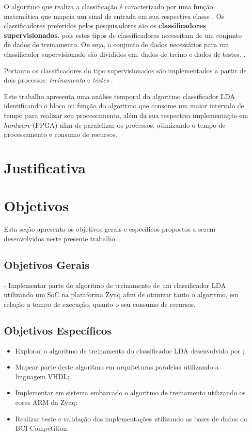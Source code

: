 O algoritmo que realiza a classificação é caracterizado por uma função matemática que mapeia um sinal de entrada em sua respectiva classe \cite{lottephd}. Os classificadores preferidos pelos pesquisadores são os \textbf{classificadores supervisionados}, pois estes tipos de classificadores necessitam de um conjunto de dados de treinamento. Ou seja, o conjunto de dados necessários para um classificador supervisionado são divididos em: dados de treino e dados de testes. \cite{Siulybook}.

Portanto os classificadores do tipo supervisionados são implementados a partir de dois processos: \textit{treinamento} e \textit{testes} \cite{Siulybook}.



Este trabalho apresenta uma análise temporal do algoritmo classificador LDA identificando o bloco ou função do algoritmo que consome um maior intervalo de tempo para realizar seu processamento, além da sua respectiva implementação em \textit{hardware} (FPGA) afim de paralelizar os processos, otimizando o tempo de processamento e consumo de recursos.

\section{Justificativa}

\section{Objetivos}
Esta seção apresenta os objetivos gerais e específicos propostos a serem desenvolvidos neste presente trabalho.
\subsection{Objetivos Gerais}
- Implementar parte do algoritmo de treinamento de um classificador LDA utilizando um SoC na plataforma Zynq afim de otimizar tanto o algoritmo, em relação a tempo de execução, quanto o seu consumo de recursos. 
\subsection{Objetivos Específicos}

\begin{itemize}
	\item Explorar o algoritmo de treinamento do classificador LDA desenvolvido por \cite{F.Lotte};
	\item Mapear parte deste algoritmo em arquiteturas paralelas utilizando a linguagem VHDL;
	\item Implementar em sistema embarcado o algoritmo de treinamento utilizando os cores ARM da Zynq;
	\item Realizar teste e validação das implementações utilizando as bases de dados do BCI Competition.
\end{itemize}